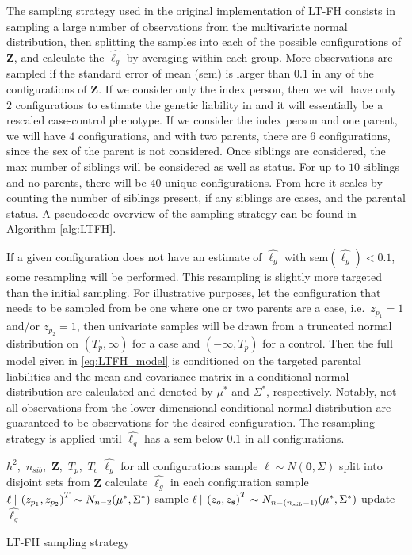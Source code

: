 The sampling strategy used in the original implementation of LT-FH consists in sampling a large number of observations from the multivariate normal distribution, then splitting the samples into each of the possible configurations of $ \mathbf{Z} $, and calculate the $ \hat{\ell_g} $ by averaging within each group. More observations are sampled if the standard error of mean (sem) is larger than $ 0.1 $ in any of the configurations of $ \mathbf{Z} $. If we consider only the index person, then we will have only $ 2 $ configurations to estimate the genetic liability in and it will essentially be a rescaled case-control phenotype. If we consider the index person and one parent, we will have $ 4 $ configurations, and with two parents, there are $ 6 $ configurations, since the sex of the parent is not considered. Once siblings are considered, the max number of siblings will be considered as well as status. For up to $ 10 $ siblings and no parents, there will be $ 40 $ unique configurations. From here it scales by counting the number of siblings present, if any siblings are cases, and the parental status. A pseudocode overview of the sampling strategy can be found in Algorithm \ref{alg:LTFH}.

If a given configuration does not have an estimate of $ \hat{\ell_g} $ with sem$(\hat{\ell_g}) < 0.1 $, some resampling will be performed. This resampling is slightly more targeted than the initial sampling. For illustrative purposes, let the configuration that needs to be sampled from be one where one or two parents are a case, i.e.\ $ z_{p_1}  = 1$ and/or $ z_{p_2} = 1$, then univariate samples will be drawn from a truncated normal distribution on $ (T_p, \infty) $ for a case and $ (-\infty, T_p) $ for a control. Then the full model given in \cref{eq:LTFH_model} is conditioned on the targeted parental liabilities and the mean and covariance matrix in a conditional normal distribution are calculated and denoted by $ \mu^{\ast} $ and $ \Sigma^{\ast} $, respectively. Notably, not all observations from the lower dimensional conditional normal distribution are guaranteed to be observations for the desired configuration. The resampling strategy is applied until $ \hat{\ell_g} $ has a sem below $ 0.1 $ in all configurations.

\begin{algorithm}[h] 
\begin{algorithmic}[1] 
\INPUT $ h^2,$  $n_{sib},$  $\mathbf{Z},$  $T_p,$  $T_c$ 
\OUTPUT $ \hat{\ell_g} $ for all configurations
\STATE sample $ \ell \sim N(\mathbf{0}, \Sigma) $ 
\STATE split into disjoint sets from $ \mathbf{Z} $
\STATE calculate $ \hat{\ell_g} $ in each configuration 
		\STATE sample  $ \ell \:\vert\: \left(z_{p_1}, z_{p_2} \right)^T \sim N_{n-2}(\mu^{\ast}, \Sigma^{\ast}) $
		\STATE sample $ \ell \:\vert\: \left(z_{o}, z_{\mathbf{s}} \right)^T \sim N_{n-(n_{sib} - 1)}(\mu^{\ast}, \Sigma^{\ast}) $
	\ENDIF	
	\STATE update $ \hat{\ell_g} $
\ENDWHILE
\end{algorithmic}
\caption{LT-FH sampling strategy}
\label{alg:LTFH}
\end{algorithm}


